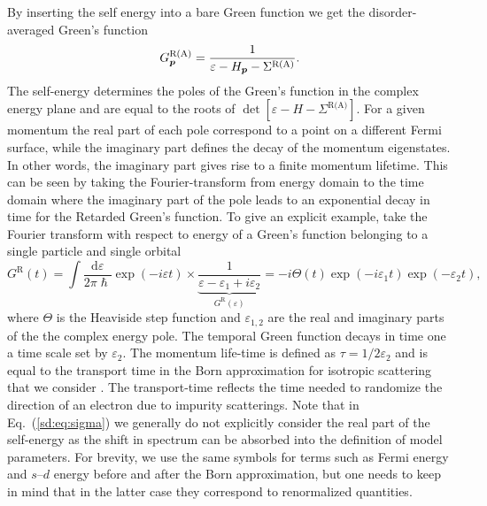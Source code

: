 By inserting the self energy into a bare Green function we get the disorder-averaged Green's function
\begin{equation}
	G^\text{R(A)}_{\boldsymbol{p}} = \frac{1}{\varepsilon-H_{\boldsymbol{p}}-\Sigma^\text{R(A)}}.
\end{equation}
The self-energy determines the poles of the Green's function in the complex energy plane and are equal to the roots of $\det[\varepsilon-H-\Sigma^\text{R(A)}]$. For a given momentum the real part of each pole correspond to a point on a different Fermi surface, while the imaginary part defines the decay of the momentum eigenstates. In other words, the imaginary part gives rise to a finite momentum lifetime. This can be seen by taking the Fourier-transform from energy domain to the time domain where the imaginary part of the pole leads to an exponential decay in time for the Retarded Green's function. To give an explicit example, take the Fourier transform with respect to energy of a Green's function belonging to a single particle and single orbital 
\begin{equation}
	G^\text{R}(t) = \int\!\frac{\mathrm{d}\varepsilon}{2\pi\hslash} \exp(-i \varepsilon t)\times\underbrace{\frac{1}{\varepsilon-\varepsilon_1+i\varepsilon_2}}_{G^\text{R}(\varepsilon)} = -i\Theta(t)\exp(-i\varepsilon_1t)\exp(-\varepsilon_2 t), 
\end{equation}
where $\Theta$ is the Heaviside step function and $\varepsilon_{1,2}$ are the real and imaginary parts of the the complex energy pole. The temporal Green function decays in time one a time scale set by $\varepsilon_2$. The momentum life-time is defined as $\tau = 1/2\varepsilon_2$ and is equal to the transport time in the Born approximation for isotropic scattering that we consider \cite{rammer_quantum_1986}. The transport-time reflects the time needed to randomize the direction of an electron due to impurity scatterings. Note that in Eq.~(\ref{sd:eq:sigma}) we generally do not explicitly consider the real part of the self-energy as the shift in spectrum can be absorbed into the definition of model parameters. For brevity, we use the same symbols for terms such as Fermi energy and $s$--$d$ energy before and after the Born approximation, but one needs to keep in mind that in the latter case they correspond to renormalized quantities. 


